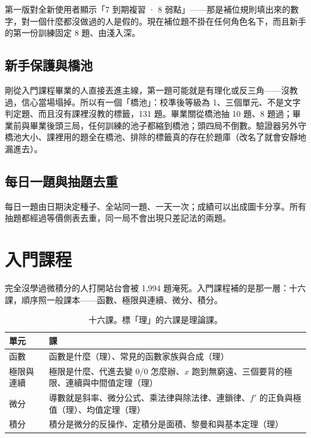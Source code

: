 \documentclass[11pt,a4paper,oneside]{report}
\renewcommand{\_}{\ifmmode\origunderscore\else\textunderscore\allowbreak\fi}
\begin{document}
\begin{pitfall}[補位題掛在錯的名下]
第一版對全新使用者顯示「7 到期複習 · 8 弱點」——那是補位規則填出來的數字，對一個什麼都沒做過的人是假的。現在補位題不掛在任何角色名下，而且新手的第一份訓練固定 8 題、由淺入深。
\end{pitfall}

\section{新手保護與橋池}
剛從入門課程畢業的人直接丟進主線，第一題可能就是有理化或反三角——沒教過，信心當場塌掉。所以有一個「橋池」：校準後等級為 1、三個單元、不是文字判定題、而且沒有課裡沒教的標籤，131 題。畢業關從橋池抽 10 題、8 題過；畢業前與畢業後頭三局，任何訓練的池子都縮到橋池；頭四局不倒數。驗證器另外守橋池大小、課裡用的題全在橋池、排除的標籤真的存在於題庫（改名了就會安靜地漏進去）。

\section{每日一題與抽題去重}
每日一題由日期決定種子、全站同一題、一天一次；成績可以出成圖卡分享。所有抽題都經過等價側表去重，同一局不會出現只差記法的兩題。

\chapter{入門課程}
完全沒學過微積分的人打開站台會被 1,994 題淹死。入門課程補的是那一層：十六課，順序照一般課本——函數、極限與連續、微分、積分。

\begin{table}[h]
\centering\small\sffamily
\begin{tabularx}{\textwidth}{@{}lY@{}}
\toprule
單元 & 課 \\
\midrule
函數 & 函數是什麼（理）、常見的函數家族與合成（理） \\
極限與連續 & 極限是什麼、代進去變 0/0 怎麼辦、$x$ 跑到無窮遠、三個要背的極限、連續與中間值定理（理） \\
微分 & 導數就是斜率、微分公式、乘法律與除法律、連鎖律、$f'$ 的正負與極值（理）、均值定理（理） \\
積分 & 積分是微分的反操作、定積分是面積、黎曼和與基本定理（理） \\
\bottomrule
\end{tabularx}
\caption{十六課。標「理」的六課是理論課。}
\end{table}
\end{document}
